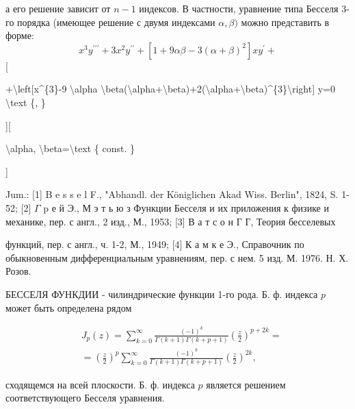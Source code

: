 \documentclass[10pt]{article}
\begin{document}
а его решение зависит от $n-1$ индексов. В частности, уравнение типа Бесселя 3-го порядка (имеющее решение с двумя индексами $\alpha, \beta)$ можно представить в форме:\[

x^{3} y^{\prime \prime \prime}+3 x^{2} y^{\prime \prime}+\left[1+9 \alpha \beta-3(\alpha+\beta)^{2}\right] x y^{\prime}+

\][



+\textbackslash left[x\^{}\{3\}-9 \textbackslash alpha \textbackslash beta(\textbackslash alpha+\textbackslash beta)+2(\textbackslash alpha+\textbackslash beta)\^{}\{3\}\textbackslash right] y=0 \textbackslash text \{, \}



][



\textbackslash alpha, \textbackslash beta=\textbackslash text \{ const. \}

]



Jum.: [1] B e s s e l F., "Abhandl. der Königlichen Akad Wiss. Berlin", 1824, S. 1-52; [2] $\Gamma$ p е й Э., М э т ь ю з Функции Бесселя и их приложения к физике и механике, пер. с англ., 2 изд., М., 1953; [3] В а т с о н Г Г, Теория бесселевых

функций, пер. с англ., ч. 1-2, М., 1949; [4] К а м к е Э., Справочник по обыкновенным дифференциальным уравнениям, пер. с нем. 5 изд. М. 1976. Н. Х. Розов.



БЕССЕЛЯ ФУНКДИИ - чилиндрические функции 1-го рода. Б. ф. индекса $p$ может быть определена рядом



\[

\begin{aligned}

& J_{p}(z)=\sum_{k=0}^{\infty} \frac{(-1)^{k}}{\Gamma(k+1) \Gamma(k+p+1)}\left(\frac{z}{2}\right)^{p+2 k}= \\

& =\left(\frac{z}{2}\right)^{p} \sum_{k=0}^{\infty} \frac{(-1)^{k}}{\Gamma(k+1) \Gamma(k+p+1)}\left(\frac{z}{2}\right)^{2 k},

\end{aligned}

\]



сходящемся на всей плоскости. Б. ф. индекса $p$ является решением соответствующего Бесселя уравнения.
\end{document}
